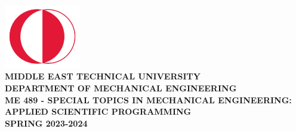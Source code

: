 \begin{titlepage}
   \begin{center}
        \includegraphics[width=0.25\textwidth]{structurals/metu.png}\\
        \vspace*{1cm}
        \Large
        \textbf{MIDDLE EAST TECHNICAL UNIVERSITY}\\
        \vspace{0.05cm}
        \textbf{DEPARTMENT OF MECHANICAL ENGINEERING}\\
        \vspace{2.5cm}
        \textbf{ME 489 - SPECIAL TOPICS IN MECHANICAL ENGINEERING: APPLIED SCIENTIFIC PROGRAMMING}\\
        \vspace{.75cm}
        \textbf{SPRING 2023-2024}\\
        \vspace{2cm}
        \\
        \vspace{5cm}
         \\
        \vspace{.5cm}
         \\

       \vfill
       
       \small
            
       \vspace{0cm}

            
   \end{center}
\end{titlepage}